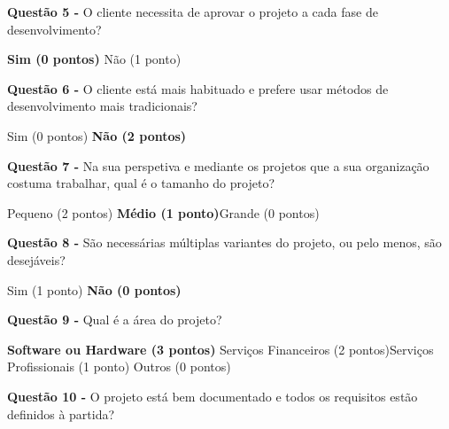 \begin{framed}
\newline\textbf{Questão 5 - } O cliente necessita de aprovar o projeto a cada fase de desenvolvimento?
\newline \begin{center} \textbf{Sim (0 pontos)} \hspace{30mm} Não (1 ponto)\end{center}
\vspace{2mm}
\newline\textbf{Questão 6 - } O cliente está mais habituado e prefere usar métodos de desenvolvimento mais tradicionais?
\newline \begin{center} Sim (0 pontos) \hspace{30mm} \textbf{Não (2 pontos)}\end{center}
\newline\textbf{Questão 7 - } Na sua perspetiva e mediante os projetos que a sua organização costuma trabalhar, qual é o tamanho do projeto?
\newline \begin{center} Pequeno (2 pontos) \hspace{17mm} \textbf{Médio (1 ponto)}\hspace{17mm}Grande (0 pontos)\end{center}
\vspace{2mm}
\newline\textbf{Questão 8 - } São necessárias múltiplas variantes do projeto, ou pelo menos, são desejáveis?
\newline \begin{center} Sim (1 ponto) \hspace{30mm} \textbf{Não (0 pontos)}\end{center}
\vspace{2mm}
\newline\textbf{Questão 9 - } Qual é a área do projeto?
\newline \begin{center} \textbf{Software ou Hardware (3 pontos)}\hspace{17mm} Serviços Financeiros (2 pontos)\hspace{17mm}Serviços Profissionais (1 ponto)\hspace{17mm} Outros (0 pontos)\end{center}
\vspace{2mm}
\newline\textbf{Questão 10 - } O projeto está bem documentado e todos os requisitos estão definidos à partida?

\end{framed}
